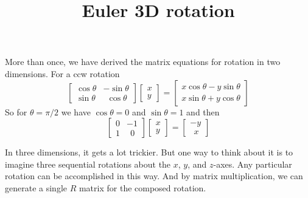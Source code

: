 \documentclass[11pt, oneside]{article}
\title{Euler 3D rotation}
\date{}
\begin{document}
\maketitle
\Large

More than once, we have derived the matrix equations for rotation in two dimensions.  For a ccw rotation
\[
\begin{bmatrix}  
\cos \theta  & -\sin \theta \\  
\sin \theta & \ \ \cos \theta  
\end{bmatrix}
\begin{bmatrix}  
x  \\  
y  
\end{bmatrix}
=
\begin{bmatrix}  
x \cos \theta - y \sin \theta  \\  
x \sin \theta + y \cos \theta 
\end{bmatrix}
\]
So for $\theta = \pi/2$ we have $\cos \theta = 0$ and $\sin \theta = 1$ and then 
\[
\begin{bmatrix}  
0  & -1 \\  
1 & \ \ 0  
\end{bmatrix}
\begin{bmatrix}  
x  \\  
y  
\end{bmatrix}
=
\begin{bmatrix}  
- y  \\  
 \ \  x
\end{bmatrix}
\]


In three dimensions, it gets a lot trickier.  But one way to think about it is to imagine three sequential rotations about the $x$, $y$, and $z$-axes.  Any particular rotation can be accomplished in this way.  And by matrix multiplication, we can generate a single $R$ matrix for the composed rotation.
\end{document}

